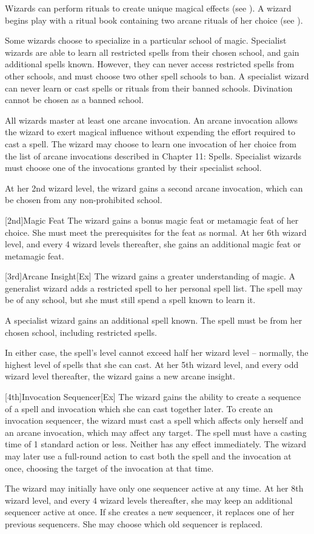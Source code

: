 Wizards can perform rituals to create unique magical effects (see ).
A wizard begins play with a ritual book containing two arcane rituals of her choice (see ).

Some wizards choose to specialize in a particular school of magic.
Specialist wizards are able to learn all restricted spells from their chosen school, and gain additional spells known.
However, they can never access restricted spells from other schools, and must choose two other spell schools to ban.
A specialist wizard can never learn or cast spells or rituals from their banned schools.
Divination cannot be chosen as a banned school.

All wizards master at least one arcane invocation.
An arcane invocation allows the wizard to exert magical influence without expending the effort required to cast a spell.
The wizard may choose to learn one invocation of her choice from the list of arcane invocations described in Chapter 11: Spells.
Specialist wizards must choose one of the invocations granted by their specialist school.

At her 2nd wizard level, the wizard gains a second arcane invocation, which can be chosen from any non-prohibited school.

[2nd]{Magic Feat}
The wizard gains a bonus magic feat or metamagic feat of her choice.
She must meet the prerequisites for the feat as normal.
At her 6th wizard level, and every 4 wizard levels thereafter, she gains an additional magic feat or metamagic feat.

[3rd]{Arcane Insight}[Ex]
The wizard gains a greater understanding of magic.
A generalist wizard adds a restricted spell to her personal spell list.
The spell may be of any school, but she must still spend a spell known to learn it.

A specialist wizard gains an additional spell known.
The spell must be from her chosen school, including restricted spells.

In either case, the spell's level cannot exceed half her wizard level -- normally, the highest level of spells that she can cast.
At her 5th wizard level, and every odd wizard level thereafter, the wizard gains a new arcane insight.

[4th]{Invocation Sequencer}[Ex]
The wizard gains the ability to create a sequence of a spell and invocation which she can cast together later.
To create an invocation sequencer, the wizard must cast a spell which affects only herself and an arcane invocation, which may affect any target.
The spell must have a casting time of 1 standard action or less.
Neither has any effect immediately.
The wizard may later use a full-round action to cast both the spell and the invocation at once, choosing the target of the invocation at that time.
\par The wizard may initially have only one sequencer active at any time.
At her 8th wizard level, and every 4 wizard levels thereafter, she may keep an additional sequencer active at once.
If she creates a new sequencer, it replaces one of her previous sequencers.
She may choose which old sequencer is replaced.

